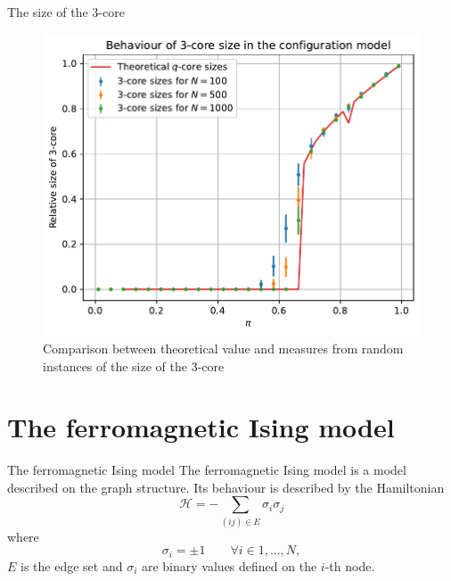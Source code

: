 \documentclass[handout]{beamer}
\begin{document}
\begin{frame}{The size of the 3-core}
    \begin{figure}
        \centering
        \includegraphics[height=.7\textheight]{qcore}
        \caption{Comparison between theoretical value and measures from random
        instances of the size of the 3-core}
        \label{fig:qcore}
    \end{figure}
\end{frame}

\section{The ferromagnetic Ising model}

\begin{frame}{The ferromagnetic Ising model}
    The \alert{ferromagnetic Ising model} is a model described on the graph
    structure. Its behaviour is described by the Hamiltonian
    \begin{equation}
        \mathcal{H} = -\sum_{(ij)\in E} \sigma_i \sigma_j
        \label{eq:ferroising_ham}
    \end{equation}
    where
    $$
        \sigma_i = \pm 1 \qquad \forall i \in 1, ..., N,
    $$
    $E$ is the edge set and $\sigma_i$ are binary values defined on the $i$-th
    node.
\end{frame}
\end{document}

